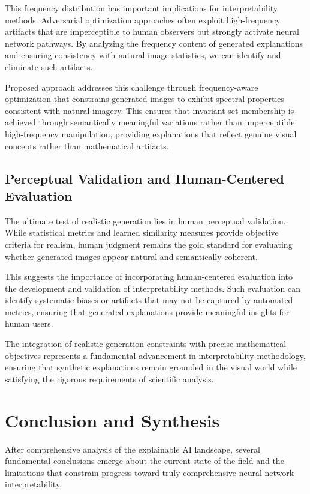 This frequency distribution has important implications for interpretability methods. Adversarial optimization approaches often exploit high-frequency artifacts that are imperceptible to human observers but strongly activate neural network pathways. By analyzing the frequency content of generated explanations and ensuring consistency with natural image statistics, we can identify and eliminate such artifacts.

Proposed approach addresses this challenge through frequency-aware optimization that constrains generated images to exhibit spectral properties consistent with natural imagery. This ensures that invariant set membership is achieved through semantically meaningful variations rather than imperceptible high-frequency manipulation, providing explanations that reflect genuine visual concepts rather than mathematical artifacts.

\subsection{Perceptual Validation and Human-Centered Evaluation}

The ultimate test of realistic generation lies in human perceptual validation. While statistical metrics and learned similarity measures provide objective criteria for realism, human judgment remains the gold standard for evaluating whether generated images appear natural and semantically coherent.

This suggests the importance of incorporating human-centered evaluation into the development and validation of interpretability methods. Such evaluation can identify systematic biases or artifacts that may not be captured by automated metrics, ensuring that generated explanations provide meaningful insights for human users.

The integration of realistic generation constraints with precise mathematical objectives represents a fundamental advancement in interpretability methodology, ensuring that synthetic explanations remain grounded in the visual world while satisfying the rigorous requirements of scientific analysis.

\section{Conclusion and Synthesis}

After comprehensive analysis of the explainable AI landscape, several fundamental conclusions emerge about the current state of the field and the limitations that constrain progress toward truly comprehensive neural network interpretability.

